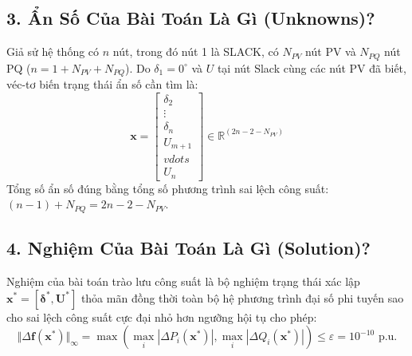\documentclass[12pt,a4paper,oneside]{report}
\begin{document}
\subsection{3. Ẩn Số Của Bài Toán Là Gì (Unknowns)?}
Giả sử hệ thống có $n$ nút, trong đó nút 1 là SLACK, có $N_{PV}$ nút PV và $N_{PQ}$ nút PQ ($n = 1 + N_{PV} + N_{PQ}$). Do $\delta_1 = 0^\circ$ và $U$ tại nút Slack cùng các nút PV đã biết, véc-tơ biến trạng thái ẩn số cần tìm là:
\begin{equation}
\mathbf{x} = 
\begin{bmatrix}
\delta_2 \\
\vdots \\
\delta_n \\
U_{m+1} \\
vdots \\
U_n
\end{bmatrix}
\in \mathbb{R}^{(2n - 2 - N_{PV})}
\end{equation}
Tổng số ẩn số đúng bằng tổng số phương trình sai lệch công suất: $(n - 1) + N_{PQ} = 2n - 2 - N_{PV}$.

\subsection{4. Nghiệm Của Bài Toán Là Gì (Solution)?}
Nghiệm của bài toán trào lưu công suất là bộ nghiệm trạng thái xác lập $\mathbf{x}^* = [\boldsymbol{\delta}^*, \mathbf{U}^*]$ thỏa mãn đồng thời toàn bộ hệ phương trình đại số phi tuyến sao cho sai lệch công suất cực đại nhỏ hơn ngưỡng hội tụ cho phép:
\begin{equation}
\Vert \Delta \mathbf{f}(\mathbf{x}^*) \Vert_\infty = \max \left( \max_{i} |\Delta P_i(\mathbf{x}^*)|, \max_{i} |\Delta Q_i(\mathbf{x}^*)| \right) \le \varepsilon = 10^{-10}\text{ p.u.}
\end{equation}
\end{document}
